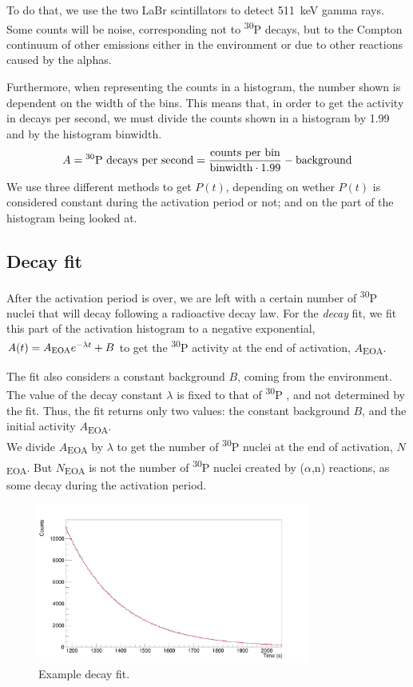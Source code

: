 \documentclass[a4paper,12pt]{report}
\newcommand{\an}{($\alpha$,n) }
\newcommand{\Piso}{\textsuperscript{30}P }
\begin{document}
To do that, we use the two LaBr scintillators to detect \qty{511}{\keV} gamma rays.
Some counts will be noise, corresponding not to \Piso decays, but to the Compton continuum of other emissions either in the environment or due to other reactions caused by the alphas.

Furthermore, when representing the counts in a histogram, the number shown is dependent on the width of the bins.
This means that, in order to get the activity in decays per second, we must divide the counts shown in a histogram by 1.99 and by the histogram binwidth.
\begin{equation}
	A = \text{\Piso decays per second} = \frac{\text{counts per bin}}{\text{binwidth}\cdot\num{1.99}} - \text{background}
\end{equation}
We use three different methods to get $P(t)$, depending on wether $P(t)$ is considered constant during the activation period or not; and on the part of the histogram being looked at.

\subsection{Decay fit}
After the activation period is over, we are left with a certain number of \Piso nuclei that will decay following a radioactive decay law.
For the \textit{decay} fit, we fit this part of the activation histogram to a negative exponential, $A(t) = A\textsubscript{EOA} e^{-\lambda t} + B$ to get the \Piso activity at the end of activation, $A$\textsubscript{EOA}.

The fit also considers a constant background $B$, coming from the environment.
The value of the decay constant $\lambda$ is fixed to that of \Piso, and not determined by the fit.
Thus, the fit returns only two values: the constant background $B$, and the initial activity $A$\textsubscript{EOA}.
\\

We divide $A$\textsubscript{EOA} by $\lambda$ to get the number of \Piso nuclei at the end of activation, $N$\textsubscript{EOA}.
But $N$\textsubscript{EOA} is not the number of \Piso nuclei created by \an reactions, as some decay during the activation period.

\begin{figure}[H]
	\centering
	\includegraphics[width=0.80\textwidth]{example_decay_fit.png}
	\caption{Example decay fit.}
	\label{example_decay_fit}
\end{figure}
\end{document}
